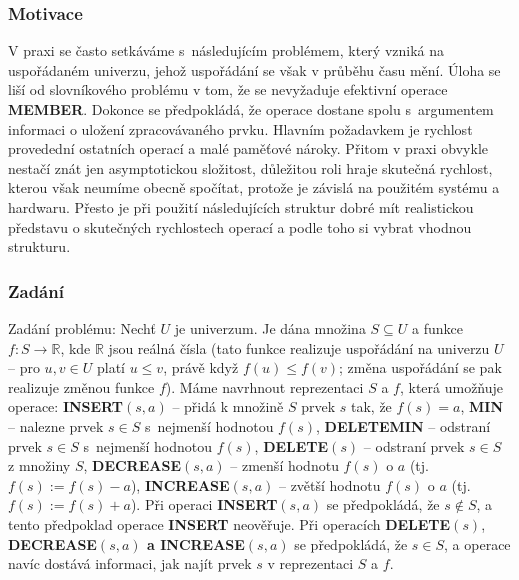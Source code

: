 \documentclass[a4paper,12pt]{article}
\begin{document}
\subsubsection{Motivace}

V praxi se často setkáváme s~následujícím 
problémem, který vzniká na uspořádaném univerzu, jehož 
uspořádání se však v průběhu času mění. Úloha se 
liší od slovníkového problému v tom, že se nevyžaduje  
efektivní operace {\bf MEMBER}. Dokonce se předpokládá, že ope\-race 
dostane spolu s~argumentem informaci o uložení 
zpracovávaného prvku. 
Hlav\-ním požadavkem je rychlost provedední ostatních operací a malé 
paměťové nároky. Přitom v praxi obvykle nestačí znát jen 
asymptotickou složitost, důležitou roli hraje skutečná 
rychlost, kterou však neumíme obecně spočítat, protože je závislá na 
použitém systému a hardwaru. Přesto je při použití 
následujících struktur dobré mít realistickou představu o 
skutečných rychlostech operací a podle toho si vybrat 
vhodnou strukturu. 

\subsubsection{Zadání}

Zadání problému: Nechť $U$ je univerzum. Je dána množina 
$S\subseteq U$ a funkce $f:S\to\mathbb R$, kde $\mathbb R$ jsou reálná čísla (tato 
funkce realizuje uspořádání na univerzu $U$ -- pro $u,
v\in U$ platí 
$u\le v$, právě když $f(u)\le f(v)$; změna uspořádání se pak realizuje 
změnou funkce $f$).
Máme navrhnout reprezentaci $S$ a $f$, která umožňuje 
operace:\newline 
{\bf INSERT$(s,a)$} -- přidá k množině $S$ prvek $s$ tak, že 
$f(s)=a$,\newline 
{\bf MIN} -- nalezne prvek $s\in S$ s~nejmenší hodnotou 
$f(s)$,\newline 
{\bf DELETEMIN} -- odstraní prvek $s\in S$ s~nejmenší hodnotou 
$f(s)$,\newline 
{\bf DELETE$(s)$} -- odstraní prvek $s\in S$ z množiny $S$,\newline 
{\bf DECREASE$(s,a)$} -- zmenší hodnotu $f(s)$ o $a$ (tj. 
$f(s):=f(s)-a$),\newline 
{\bf INCREASE$(s,a)$} -- zvětší hodnotu $f(s)$ o $a$ (tj. 
$f(s):=f(s)+a$).\newline 
Při operaci {\bf INSERT$(s,a)$} se předpokládá, že $
s\notin S$, a tento 
předpoklad operace {\bf INSERT} neověřuje. Při operacích {\bf DE\-LE\-TE$
(s)$},
{\bf DECREASE$(s,a)$ a INCREASE$(s,a)$} se před\-pokládá, že $
s\in S$, 
a operace navíc dostává informaci, jak najít  
prvek $s$ v reprezentaci $S$ a $f$. 
\end{document}
